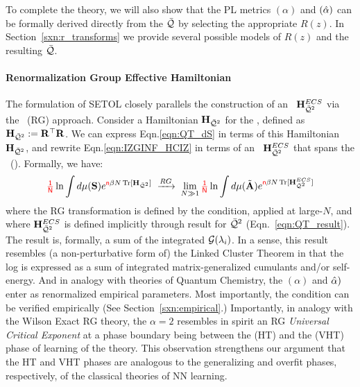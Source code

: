 To complete the theory, we
will also show that the \HTSR PL \LayerQuality metrics \ALPHA $(\alpha)$  and \ALPHAHAT $(\hat\alpha)$
can be formally derived directly from the \SETOL \LayerQuality $\bar{\mathcal{Q}}$ by selecting the appropriate
\RTransform $R(z)$. In Section~\ref{sxn:r_transforms} we provide several possible
models of $R(z)$ and the resulting \LayerQuality $\bar{\mathcal{Q}}$.

\paragraph{Renormalization Group Effective Hamiltonian}
The formulation of SETOL closely parallels the construction of an \EffectiveHamiltonian~$\mathbf{H}^{ECS}_{\bar{\mathcal{Q}}^{2}}$
via the \WilsonExactRenormalizationGroup~(RG) approach. Consider a \emph{\Bare} Hamiltonian $\mathbf{H}_{\bar{\mathcal{Q}}^{2}}$ for the \LayerQualitySquared,
defined as $\mathbf{H}_{\bar{\mathcal{Q}}^{2}}:= \mathbf{R}^{\top}\mathbf{R}$.
We can express Eqn.\ref{eqn:QT_dS} in terms of this \Bare Hamiltonian $\mathbf{H}_{\bar{\mathcal{Q}}^{2}}$,
and rewrite Eqn.\ref{eqn:IZGINF_HCIZ} in terms of an \emph{\Renormalized} \EffectiveHamiltonian~$\mathbf{H}^{ECS}_{\bar{\mathcal{Q}}^{2}}$
that spans the \EffectiveCorrelationSpace~(\ECS). Formally, we have:
\begin{align}
\label{eqn:RG}
{\color{red}\sf{\tfrac{1}{N}}}\ln \int d\mu({\mathbf{S}})e^{{\color{red}\sf{n}} \beta N \operatorname{Tr}[\mathbf{H}_{\bar{\mathcal{Q}}^{2}}]} \;\xrightarrow{RG}\; \lim_{N\gg 1}{\color{red}\sf{\tfrac{1}{N}}}\ln \int d\mu(\tilde{\mathbf{A}})e^{{\color{red}\sf{n}} \beta N \operatorname{Tr}[\mathbf{H}^{ECS}_{\bar{\mathcal{Q}}^{2}}]} 
\end{align}
where the RG transformation is defined by the \ScaleInvariant \TRACELOG condition,
applied at large-$N$,
and where $\mathbf{H}^{ECS}_{\bar{\mathcal{Q}}^{2}}$ is defined implicitly through result for $\bar{\mathcal{Q}}^{2}$ (Eqn.~\ref{eqn:QT_result}).
The result is, formally, a sum of the integrated \RTransforms $\mathcal{G}(\lambda_{i})$.
In a sense, this result resembles (a non-perturbative form of) the Linked Cluster Theorem
in that the log \PartitionFunction is expressed as a sum of integrated matrix-generalized cumulants and/or self-energy.  And in analogy with \SemiEmpirical theories of Quantum Chemistry, the \HTSR \ALPHA $(\alpha)$ and \ALPHAHAT $\hat\alpha)$ enter as renormalized empirical parameters.
Most importantly, the \ScaleInvariant \TRACELOG condition can be verified empirically (See Section~\ref{sxn:empirical}.)
Importantly, in analogy with the Wilson Exact RG theory, 
the \HTSR $\alpha=2$ resembles in spirit
an RG \emph{Universal Critical Exponent} at a phase boundary being between the \HeavyTailed 
(HT) and the \VeryHeavyTailed (VHT) phase of learning of the \HTSR theory.
This observation strengthens our argument that the \HTSR HT and VHT phases
are analogous to the generalizing and overfit phases, respectively,
of the classical \SMOG theories of NN learning.


